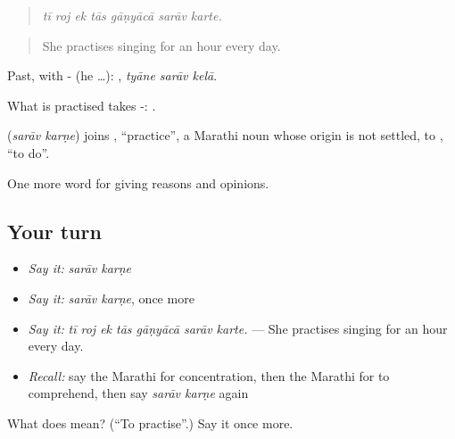 \begin{quote}
\emph{tī roj ek tās gāṇyācā sarāv karte.}
\end{quote}

\begin{quote}
She practises singing for an hour every day.
\end{quote}

Past, with - (he …):   , \emph{tyāne sarāv kelā}.

What is practised takes -:  .

\begin{cousinweb}
\textbf{ } (\emph{sarāv karṇe}) joins , \textquotedblleft{}practice\textquotedblright{}, a Marathi noun whose origin is not settled, to , \textquotedblleft{}to do\textquotedblright{}.
\end{cousinweb}

\begin{grammarlens}[title={What you've built}]
One more word for giving reasons and opinions.
\end{grammarlens}

\subsection*{Your turn}
\begin{itemize}
\raggedright
  \item \emph{Say it:} \emph{sarāv karṇe}
  \item \emph{Say it:} \emph{sarāv karṇe}, once more
  \item \emph{Say it:} \emph{tī roj ek tās gāṇyācā sarāv karte.} — She practises singing for an hour every day.
  \item \emph{Recall:} say the Marathi for concentration, then the Marathi for to comprehend, then say \emph{sarāv karṇe} again
\end{itemize}

\begin{tcolorbox}[breakable,colback=teal!4,colframe=teal!35!black,title={Before you move on}]
What does   mean? (\textquotedblleft{}To practise\textquotedblright{}.) Say it once more.
\end{tcolorbox}
